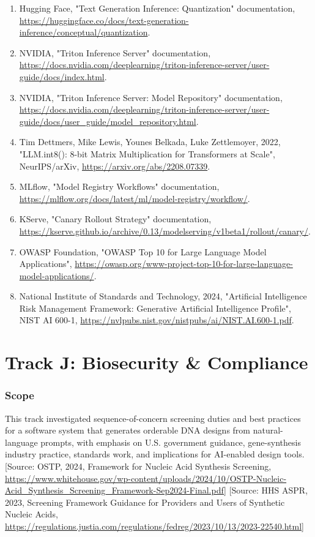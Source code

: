 \documentclass[11pt]{report}
\begin{document}
\begin{enumerate}
\item Hugging Face, "Text Generation Inference: Quantization" documentation, \url{https://huggingface.co/docs/text-generation-inference/conceptual/quantization}.
\item NVIDIA, "Triton Inference Server" documentation, \url{https://docs.nvidia.com/deeplearning/triton-inference-server/user-guide/docs/index.html}.
\item NVIDIA, "Triton Inference Server: Model Repository" documentation, \url{https://docs.nvidia.com/deeplearning/triton-inference-server/user-guide/docs/user_guide/model_repository.html}.
\item Tim Dettmers, Mike Lewis, Younes Belkada, Luke Zettlemoyer, 2022, "LLM.int8(): 8-bit Matrix Multiplication for Transformers at Scale", NeurIPS/arXiv, \url{https://arxiv.org/abs/2208.07339}.
\item MLflow, "Model Registry Workflows" documentation, \url{https://mlflow.org/docs/latest/ml/model-registry/workflow/}.
\item KServe, "Canary Rollout Strategy" documentation, \url{https://kserve.github.io/archive/0.13/modelserving/v1beta1/rollout/canary/}.
\item OWASP Foundation, "OWASP Top 10 for Large Language Model Applications", \url{https://owasp.org/www-project-top-10-for-large-language-model-applications/}.
\item National Institute of Standards and Technology, 2024, "Artificial Intelligence Risk Management Framework: Generative Artificial Intelligence Profile", NIST AI 600-1, \url{https://nvlpubs.nist.gov/nistpubs/ai/NIST.AI.600-1.pdf}.
\end{enumerate}

\chapter{Track J: Biosecurity \& Compliance}

\subsection{Scope}
This track investigated sequence-of-concern screening duties and best practices for a software system that generates orderable DNA designs from natural-language prompts, with emphasis on U.S. government guidance, gene-synthesis industry practice, standards work, and implications for AI-enabled design tools. [Source: OSTP, 2024, Framework for Nucleic Acid Synthesis Screening, \url{https://www.whitehouse.gov/wp-content/uploads/2024/10/OSTP-Nucleic-Acid_Synthesis_Screening_Framework-Sep2024-Final.pdf}] [Source: HHS ASPR, 2023, Screening Framework Guidance for Providers and Users of Synthetic Nucleic Acids, \url{https://regulations.justia.com/regulations/fedreg/2023/10/13/2023-22540.html}]\par
\end{document}
